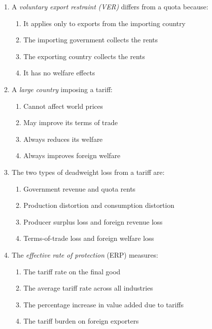 \documentclass[12pt]{article}
\begin{document}
\begin{enumerate}[label=\textbf{\arabic*.}]
\item A \textit{voluntary export restraint (VER)} differs from a quota because:
\begin{enumerate}[label=\Alph*.]
\item It applies only to exports from the importing country
\item The importing government collects the rents
\item The exporting country collects the rents
\item It has no welfare effects
\end{enumerate}

\item A \textit{large country} imposing a tariff:
\begin{enumerate}[label=\Alph*.]
\item Cannot affect world prices
\item May improve its terms of trade
\item Always reduces its welfare
\item Always improves foreign welfare
\end{enumerate}
\vspace{0.1 cm}
\item The two types of deadweight loss from a tariff are:
\begin{enumerate}[label=\Alph*.]
\item Government revenue and quota rents
\item Production distortion and consumption distortion
\item Producer surplus loss and foreign revenue loss
\item Terms-of-trade loss and foreign welfare loss
\end{enumerate}
\vspace{0.1 cm}

\item The \textit{effective rate of protection} (ERP) measures:
\begin{enumerate}[label=\Alph*.]
\item The tariff rate on the final good
\item The average tariff rate across all industries
\item The percentage increase in value added due to tariffs
\item The tariff burden on foreign exporters
\end{enumerate}

\end{enumerate}
\end{document}
